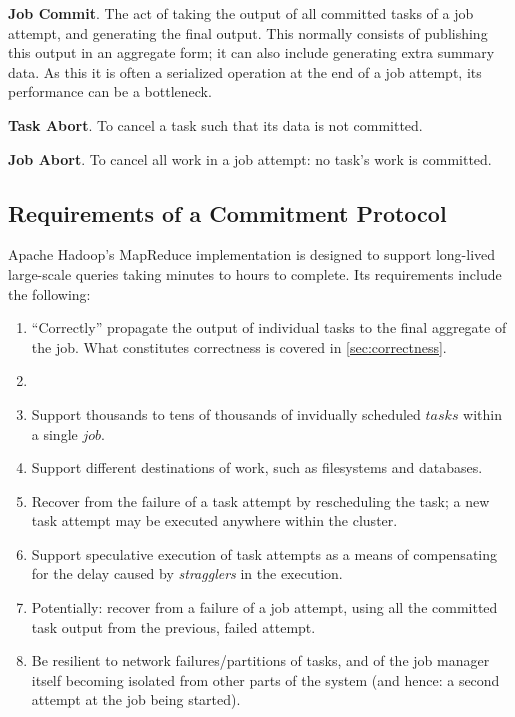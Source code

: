 \documentclass[conference]{IEEEtran}
\begin{document}
\textbf{Job Commit}.
The act of taking the output of all committed tasks of a job attempt,
and generating the final output.
This normally consists of publishing this output in an aggregate form;
it can also include generating extra summary data.
As this it is often a serialized operation at the end of a job attempt,
its performance can be a bottleneck.

\textbf{Task Abort}.
To cancel a task such that its data is not committed.

\textbf{Job Abort}.
To cancel all work in a job attempt: no task's work is committed.


\subsection{Requirements of a Commitment Protocol}
\label{subsec:requirementsOfACommitmentProtocol}

Apache Hadoop's MapReduce implementation is designed to support long-lived
large-scale queries taking minutes to hours to complete.
Its requirements include the following:

\begin{enumerate}

  \item ``Correctly'' propagate the output of individual tasks to the final
  aggregate of the job.
  What constitutes correctness is covered in \ref{sec:correctness}.
  \item
  \item Support thousands to tens of thousands of invidually scheduled $tasks$
  within a single $job$.

  \item Support different destinations of work, such as filesystems and databases.

  \item Recover from the failure of a task attempt by rescheduling the task;
  a new task attempt may be executed anywhere within the cluster.

  \item Support speculative execution of task attempts as a means of compensating for the
  delay caused by \emph{stragglers} in the execution.

  \item Potentially: recover from a failure of a job attempt, using all the committed
  task output from the previous, failed attempt.

  \item Be resilient to network failures/partitions of tasks, and of the job manager
  itself becoming isolated from other parts of the system (and hence: a second
  attempt at the job being started).

\end{enumerate}
\end{document}
